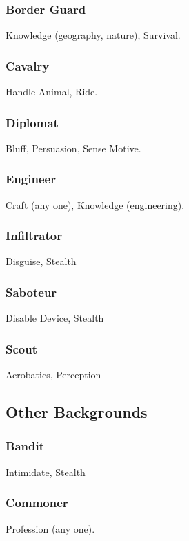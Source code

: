 \subsubsection{Border Guard}
 Knowledge (geography, nature), Survival.

\subsubsection{Cavalry}
 Handle Animal, Ride.

\subsubsection{Diplomat}
 Bluff, Persuasion, Sense Motive.

\subsubsection{Engineer}
 Craft (any one), Knowledge (engineering).

\subsubsection{Infiltrator}
 Disguise, Stealth

\subsubsection{Saboteur}
 Disable Device, Stealth

\subsubsection{Scout}
 Acrobatics, Perception

\subsection{Other Backgrounds}

\subsubsection{Bandit}
 Intimidate, Stealth

\subsubsection{Commoner}
 Profession (any one).

